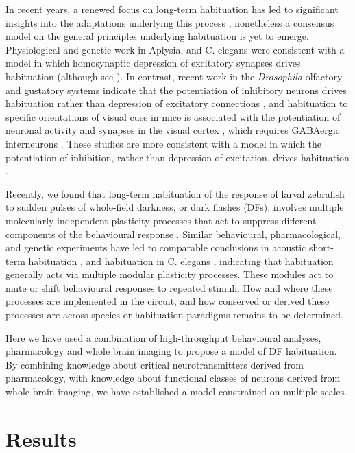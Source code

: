 \documentclass[9pt,lineno]{RandlettLab_elife}
\begin{document}
In recent years, a renewed focus on long-term habituation has led to significant insights into the adaptations underlying this process \cite{Cooke2020-mz, McDiarmid2019-mh}, nonetheless a consensus model on the general principles underlying habituation is yet to emerge.  Physiological and genetic work in Aplysia, and C. elegans were consistent with a model in which homosynaptic depression of excitatory synapses drives habituation \cite{Bailey1983-ei, Rose2003-dl} (although see \cite{Glanzman2009-tz}). In contrast, recent work in the \emph{Drosophila} olfactory and gustatory systems indicate that the potentiation of inhibitory neurons drives habituation rather than depression of excitatory connections \cite{Das2011-gd, Paranjpe2012-ce, Trisal2022-pa},  and habituation to specific orientations of visual cues in mice is associated with the potentiation of neuronal activity and synapses in the visual cortex \cite{Cooke2015-qs}, which requires GABAergic interneurons \cite{Kaplan2016-qk}. These studies are more consistent with a model in which the potentiation of inhibition, rather than depression of excitation, drives habituation \cite{Cooke2020-mz}. 

Recently, we found that long-term habituation of the response of larval zebrafish to sudden pulses of whole-field darkness, or dark flashes (DFs), involves multiple molecularly independent plasticity processes that act to suppress different components of the behavioural response \cite{Randlett2019-fi}. Similar behavioural, pharmacological, and genetic experiments have led to comparable conclusions in acoustic short-term habituation \cite{Nelson2022-qr}, and habituation in C. elegans \cite{McDiarmid2019-lo, McDiarmid2019-mh}, indicating that habituation generally acts via multiple modular plasticity processes. These modules act to mute or shift behavioural responses to repeated stimuli. How and where these processes are implemented in the circuit, and how conserved or derived these processes are across species or habituation paradigms remains to be determined. 

Here we have used a combination of high-throughput behavioural analyses, pharmacology and whole brain imaging to propose a model of DF habituation. By combining knowledge about critical neurotransmitters derived from pharmacology, with knowledge about functional classes of neurons derived from whole-brain imaging, we have established a model constrained on multiple scales.


\section{Results}
\end{document}

